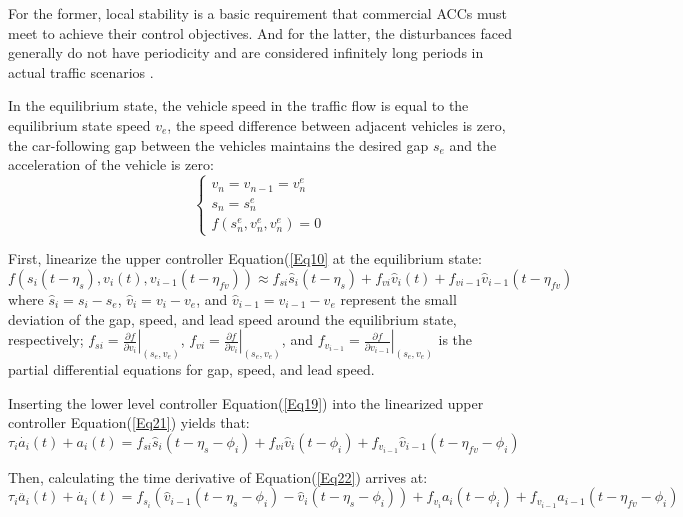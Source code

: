 \documentclass[a4paper]{cas-sc}
\begin{document}
For the former, local stability is a basic requirement that commercial ACCs must meet to achieve their control objectives. And for the latter, the disturbances faced generally do not have periodicity and are considered infinitely long periods in actual traffic scenarios \citep{Bian2019,Xiao2011}.

In the equilibrium state, the vehicle speed in the traffic flow is equal to the equilibrium state speed $v_e$, the speed difference between adjacent vehicles is zero, the car-following gap between the vehicles maintains the desired gap $s_e$ and the acceleration of the vehicle is zero:
\begin{equation}
  \left\{\begin{array}{l}
    v_{n}=v_{n-1}=v_{n}^{e} \\
    s_{n}=s_{n}^{e}         \\
    f\left(s_{n}^{e}, v_{n}^{e}, v_{n}^{e}\right)=0
  \end{array}\right.
  \label{Eq20}
\end{equation}

First, linearize the upper controller Equation(\ref{Eq10} at the equilibrium state:
\begin{equation}
  f\left(s_i\left(t-\eta_s\right),v_i\left(t\right),v_{i-1}\left(t-\eta_{fv}\right)\right)\approx f_{si}{\hat{s}}_i\left(t-\eta_s\right)+f_{vi}{\hat{v}}_i\left(t\right)+f_{vi-1}{\hat{v}}_{i-1}\left(t-\eta_{fv}\right)
  \label{Eq21}
\end{equation}
where ${\hat{s}}_i=s_i-s_e$, ${\hat{v}}_i=v_i-v_e$, and ${\hat{v}}_{i-1}=v_{i-1}-v_e$ represent the small deviation of the gap, speed, and lead speed around the equilibrium state, respectively; $f_{si}=\left.\frac{\partial f}{\partial v_i}\right|_{\left(s_e,v_e\right)}$, $f_{vi}=\left.\frac{\partial f}{\partial v_i}\right|_{\left(s_e,v_e\right)}$, and $f_{v_{i-1}}=\left.\frac{\partial f}{\partial v_{i-1}}\right|_{\left(s_e,v_e\right)}$ is the partial differential equations for gap, speed, and lead speed.

Inserting the lower level controller Equation(\ref{Eq19}) into the linearized upper controller Equation(\ref{Eq21}) yields that:
\begin{equation}
  \tau_i\dot{a_i}\left(t\right)+a_i\left(t\right)=f_{si}{\hat{s}}_i\left(t-\eta_s-\phi_i\right)+f_{vi}{\hat{v}}_i\left(t-\phi_i\right)+f_{v_{i-1}}{\hat{v}}_{i-1}\left(t-\eta_{fv}-\phi_i\right)
  \label{Eq22}
\end{equation}

Then, calculating the time derivative of Equation(\ref{Eq22}) arrives at:
\begin{equation}
  \tau_i\ddot{a_i}\left(t\right)+\dot{a_i}\left(t\right)=f_{s_i}\left({\hat{v}}_{i-1}\left(t-\eta_s-\phi_i\right)-{\hat{v}}_i\left(t-\eta_s-\phi_i\right)\right)+f_{v_i}a_i\left(t-\phi_i\right)+f_{v_{i-1}}a_{i-1}\left(t-\eta_{fv}-\phi_i\right)
  \label{Eq23}
\end{equation}
\end{document}

